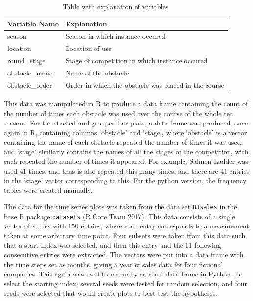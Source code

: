 \documentclass[
  11pt,
]{book}
\begin{document}
\begin{center}
\begin{table}

\caption{\label{tab:unnamed-chunk-4}Table with explanation of variables}
\centering
\begin{tabular}[t]{l|l}
\hline
Variable Name & Explanation\\
\hline
season & Season in which instance occured\\
\hline
location & Location of use\\
\hline
round\_stage & Stage of competition in which instance occured\\
\hline
obstacle\_name & Name of the obstacle\\
\hline
obstacle\_order & Order in which the obstacle was placed in the course\\
\hline
\end{tabular}
\end{table}
\end{center}

This data was manipulated in R to produce a data frame containing the
count of the number of times each obstacle was used over the course of
the whole ten seasons. For the stacked and grouped bar plots, a data
frame was produced, once again in R, containing columns `obstacle' and
`stage', where `obstacle' is a vector containing the name of each
obstacle repeated the number of times it was used, and `stage' similarly
contains the names of all the stages of the competition, with each
repeated the number of times it appeared. For example, Salmon Ladder was
used 41 times, and thus is also repeated this many times, and there are
41 entries in the `stage' vector corresponding to this. For the python
version, the frequency tables were created manually.

The data for the time series plots was taken from the data set
\texttt{BJsales} in the base R package \texttt{datasets} (R Core Team
\protect\hyperlink{ref-R}{2017}). This data consists of a single vector
of values with 150 entries, where each entry corresponds to a
measurement taken at some arbitrary time point. Four subsets were taken
from this data such that a start index was selected, and then this entry
and the 11 following consecutive entries were extracted. The vectors
were put into a data frame with the time steps set as months, giving a
year of sales data for four fictional companies. This again was used to
manually create a data frame in Python. To select the starting index,
several seeds were tested for random selection, and four seeds were
selected that would create plots to best test the hypotheses.
\end{document}
